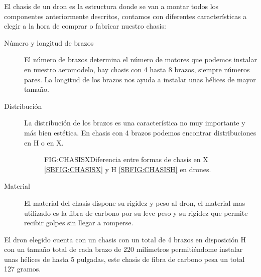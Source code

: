 
	El chasis de un dron es la estructura donde se van a montar todos los componentes anteriormente descritos, contamos con diferentes características a elegir a la hora de comprar o fabricar nuestro chasis:
	
	\begin{description}
	\item[Número y longitud de brazos] El número de brazos determina el número de motores que podemos instalar en nuestro aeromodelo, hay chasis con 4 hasta 8 brazos, siempre números pares.
	La longitud de los brazos nos ayuda a instalar unas hélices de mayor tamaño.
	\item[Distribución] La distribución de los brazos es una característica no muy importante y más bien estética. En chasis con 4 brazos podemos encontrar distribuciones en H o en X.
	\begin{figure}[Chasis X y H]{FIG:CHASISX}{Diferencia entre formas de chasis en X \ref{SBFIG:CHASISX} y H \ref{SBFIG:CHASISH} en drones.}
	
   \quad
  
\end{figure} 
	\item[Material] El material del chasis dispone su rigidez y peso al dron, el material mas utilizado es la fibra de carbono por su leve peso y su rigidez que permite recibir golpes sin llegar a romperse.
	\end{description}
	
	El dron elegido cuenta con un chasis con un total de 4 brazos en disposición H con un tamaño total de cada brazo de 220 milímetros permitiéndome instalar unas hélices de hasta 5 pulgadas, este chasis de fibra de carbono pesa un total 127 gramos.
	
	
